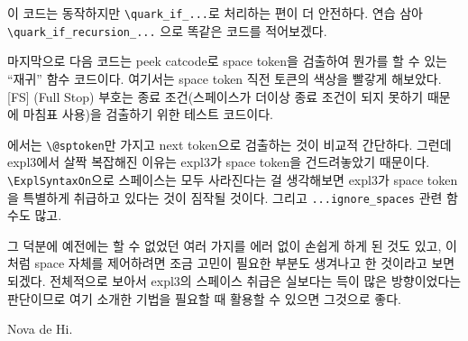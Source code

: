 \documentclass[a4paper,amsmath]{oblivoir}
\begin{document}
이 코드는 동작하지만 \verb|\quark_if_...|로 처리하는 편이 더 안전하다.
연습 삼아 \verb|\quark_if_recursion_...| 으로 똑같은 코드를 적어보겠다.


마지막으로 다음 코드는 peek catcode로 space token을 검출하여 뭔가를 할 수 있는 “재귀” 함수 코드이다.
여기서는 space token 직전 토큰의 색상을 빨갛게 해보았다. [FS] (Full Stop) 부호는 종료 조건(스페이스가 더이상 종료 조건이 되지 못하기 때문에 마침표 사용)을 검출하기 위한 테스트 코드이다.


에서는 \verb|\@sptoken|만 가지고 next token으로 검출하는 것이
비교적 간단하다. 그런데 expl3에서 살짝 복잡해진 이유는 expl3가 space token을 건드려놓았기 
때문이다. \verb|\ExplSyntaxOn|으로 스페이스는 모두 사라진다는 걸 생각해보면 expl3가 space token을 특별하게 취급하고 있다는 것이 짐작될 것이다. 그리고 \verb|...ignore_spaces| 관련 함수도 많고.

그 덕분에 예전에는 할 수 없었던 여러 가지를 에러 없이 손쉽게 하게 된 것도 있고, 이처럼 space 자체를
제어하려면 조금 고민이 필요한 부분도 생겨나고 한 것이라고 보면 되겠다. 전체적으로 보아서 expl3의 스페이스 취급은 실보다는 득이 많은 방향이었다는 판단이므로
여기 소개한 기법을 필요할 때 활용할 수 있으면 그것으로 좋다.




\vfill
\hfill Nova de Hi.
\end{document}
